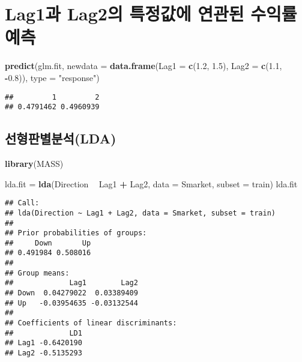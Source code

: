 \documentclass[]{article}
\newenvironment{Shaded}{\begin{snugshade}}{\end{snugshade}}
\newcommand{\KeywordTok}[1]{\textcolor[rgb]{0.13,0.29,0.53}{\textbf{#1}}}
\newcommand{\DataTypeTok}[1]{\textcolor[rgb]{0.13,0.29,0.53}{#1}}
\newcommand{\FloatTok}[1]{\textcolor[rgb]{0.00,0.00,0.81}{#1}}
\newcommand{\StringTok}[1]{\textcolor[rgb]{0.31,0.60,0.02}{#1}}
\newcommand{\OperatorTok}[1]{\textcolor[rgb]{0.81,0.36,0.00}{\textbf{#1}}}
\newcommand{\NormalTok}[1]{#1}
\begin{document}
\section{Lag1과 Lag2의 특정값에 연관된 수익률 예측}\label{lag1-lag2----}

\begin{Shaded}
\begin{Highlighting}[]
\KeywordTok{predict}\NormalTok{(glm.fit, }\DataTypeTok{newdata =} \KeywordTok{data.frame}\NormalTok{(}\DataTypeTok{Lag1 =} \KeywordTok{c}\NormalTok{(}\FloatTok{1.2}\NormalTok{, }\FloatTok{1.5}\NormalTok{), }\DataTypeTok{Lag2 =} \KeywordTok{c}\NormalTok{(}\FloatTok{1.1}\NormalTok{, }\OperatorTok{-}\FloatTok{0.8}\NormalTok{)),}
        \DataTypeTok{type =} \StringTok{"response"}\NormalTok{)}
\end{Highlighting}
\end{Shaded}

\begin{verbatim}
##         1         2 
## 0.4791462 0.4960939
\end{verbatim}

\subsection{선형판별분석(LDA)}\label{lda}

\begin{Shaded}
\begin{Highlighting}[]
\KeywordTok{library}\NormalTok{(MASS)}
\end{Highlighting}
\end{Shaded}

\begin{Shaded}
\begin{Highlighting}[]
\NormalTok{lda.fit =}\StringTok{ }\KeywordTok{lda}\NormalTok{(Direction }\OperatorTok{~}\StringTok{ }\NormalTok{Lag1 }\OperatorTok{+}\StringTok{ }\NormalTok{Lag2, }\DataTypeTok{data =}\NormalTok{ Smarket, }\DataTypeTok{subset =}\NormalTok{ train)}
\NormalTok{lda.fit}
\end{Highlighting}
\end{Shaded}

\begin{verbatim}
## Call:
## lda(Direction ~ Lag1 + Lag2, data = Smarket, subset = train)
## 
## Prior probabilities of groups:
##     Down       Up 
## 0.491984 0.508016 
## 
## Group means:
##             Lag1        Lag2
## Down  0.04279022  0.03389409
## Up   -0.03954635 -0.03132544
## 
## Coefficients of linear discriminants:
##             LD1
## Lag1 -0.6420190
## Lag2 -0.5135293
\end{verbatim}
\end{document}

